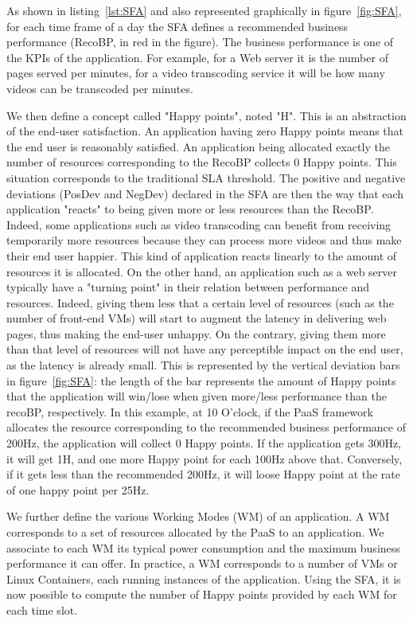 As shown in listing~\ref{lst:SFA} and also represented graphically in figure~\ref{fig:SFA}, for each time frame of a day the SFA defines a recommended business performance (RecoBP, in red in the figure). 
The business performance is one of the KPIs of the application.
For example, for a Web server it is the number of pages served per minutes, for a video transcoding service it will be how many videos can be transcoded per minutes.

We then define a concept called "Happy points", noted "H".
This is an abstraction of the end-user satisfaction.
An application having zero Happy points means that the end user is reasonably satisfied.
An application being allocated exactly the number of resources corresponding to the RecoBP collects 0 Happy points.
This situation corresponds to the traditional SLA threshold.
The positive and negative deviations (PosDev and NegDev) declared in the SFA are then the way that each application "reacts" to being given more or less resources than the RecoBP.
Indeed, some applications such as video transcoding can benefit from receiving temporarily more resources because they can process more videos and thus make their end user happier. 
This kind of application reacts linearly to the amount of resources it is allocated.
On the other hand, an application such as a web server typically have a "turning point" in their relation between performance and resources.
Indeed, giving them less that a certain level of resources (such as the number of front-end VMs) will start to augment the latency in delivering web pages, thus making the end-user unhappy.
On the contrary, giving them more than that level of resources will not have any perceptible impact on the end user, as the latency is already small.
This is represented by the vertical deviation bars in figure~\ref{fig:SFA}: the length of the bar represents the amount of Happy points that the application will win/lose when given more/less performance than the recoBP, respectively.
In this example, at 10 O’clock, if the PaaS framework allocates the resource corresponding to the recommended business performance of 200Hz, the application will collect 0 Happy points.
If the application gets 300Hz, it will get 1H, and one more Happy point for each 100Hz above that.
Conversely, if it gets less than the recommended 200Hz, it will loose Happy point at the rate of one happy point per 25Hz.

We further define the various Working Modes (WM) of an application.
A WM corresponds to a set of resources allocated by the PaaS to an application.
We associate to each WM its typical power consumption and the maximum business performance it can offer.
In practice, a WM corresponds to a number of VMs or Linux Containers, each running instances of the application.
Using the SFA, it is now possible to compute the number of Happy points provided by each WM for each time slot.

